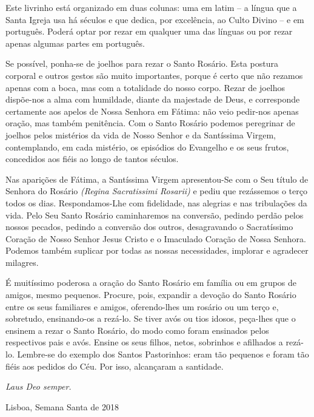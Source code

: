 Este livrinho está organizado em duas colunas: uma em latim – a língua que a Santa Igreja usa há séculos e que dedica, por excelência, ao Culto Divino – e em português. Poderá optar por rezar em qualquer uma das línguas ou por rezar apenas algumas partes em português.

Se possível, ponha-se de joelhos para rezar o Santo Rosário. Esta postura corporal e outros gestos são muito importantes, porque é certo que não rezamos apenas com a boca, mas com a totalidade do nosso corpo. Rezar de joelhos dispõe-nos a alma com humildade, diante da majestade de Deus, e corresponde certamente aos apelos de Nossa Senhora em Fátima: não veio pedir-nos apenas oração, mas também penitência. Com o Santo Rosário podemos peregrinar de joelhos pelos mistérios da vida de Nosso Senhor e da Santíssima Virgem, contemplando, em cada mistério, os episódios do Evangelho e os seus frutos, concedidos aos fiéis ao longo de tantos séculos.

Nas aparições de Fátima, a Santíssima Virgem apresentou-Se com o Seu título de Senhora do Rosário \textit{(Regina Sacratissimi Rosarii)} e pediu que rezássemos o terço todos os dias. Respondamos-Lhe com fidelidade, nas alegrias e nas tribulações da vida. Pelo Seu Santo Rosário caminharemos na conversão, pedindo perdão pelos nossos pecados, pedindo a conversão dos outros, desagravando o Sacratíssimo Coração de Nosso Senhor Jesus Cristo e o Imaculado Coração de Nossa Senhora. Podemos também suplicar por todas as nossas necessidades, implorar e agradecer milagres.

É muitíssimo poderosa a oração do Santo Rosário em família ou em grupos de amigos, mesmo pequenos. Procure, pois, expandir a devoção do Santo Rosário entre os seus familiares e amigos, oferendo-lhes um rosário ou um terço e, sobretudo, ensinando-os a rezá-lo. Se tiver avós ou tios idosos, peça-lhes que o ensinem a rezar o Santo Rosário, do modo como foram ensinados pelos respectivos pais e avós. Ensine os seus filhos, netos, sobrinhos e afilhados a rezá-lo. Lembre-se do exemplo dos Santos Pastorinhos: eram tão pequenos e foram tão fiéis aos pedidos do Céu. Por isso, alcançaram a santidade.

\textit{Laus Deo semper.}

Lisboa, Semana Santa de 2018


